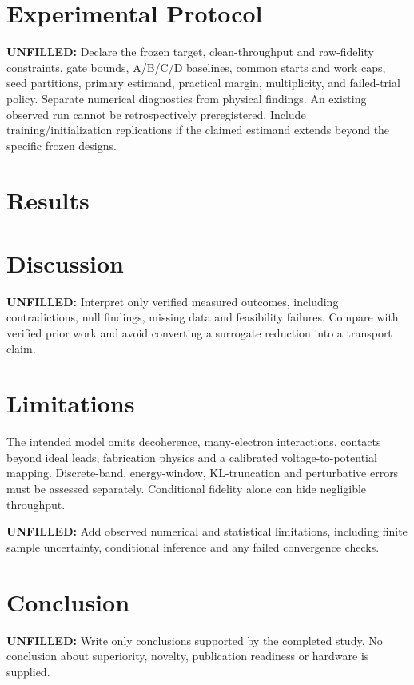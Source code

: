 \documentclass[11pt]{article}
\newcommand{\pending}[1]{\par\noindent\textbf{UNFILLED:} #1\par}
\begin{document}
\section{Experimental Protocol}
\pending{Declare the frozen target, clean-throughput and raw-fidelity constraints,
gate bounds, A/B/C/D baselines, common starts and work caps, seed partitions,
primary estimand, practical margin, multiplicity, and failed-trial policy.
Separate numerical diagnostics from physical findings. An existing observed run
cannot be retrospectively preregistered. Include training/initialization
replications if the claimed estimand extends beyond the specific frozen designs.}
\section{Results}

\section{Discussion}
\pending{Interpret only verified measured outcomes, including contradictions,
null findings, missing data and feasibility failures. Compare with verified
prior work and avoid converting a surrogate reduction into a transport claim.}
\section{Limitations}
The intended model omits decoherence, many-electron interactions, contacts beyond
ideal leads, fabrication physics and a calibrated voltage-to-potential mapping.
Discrete-band, energy-window, KL-truncation and perturbative errors must be
assessed separately. Conditional fidelity alone can hide negligible throughput.
\pending{Add observed numerical and statistical limitations, including finite
sample uncertainty, conditional inference and any failed convergence checks.}
\section{Conclusion}
\pending{Write only conclusions supported by the completed study. No conclusion
about superiority, novelty, publication readiness or hardware is supplied.}


\end{document}
